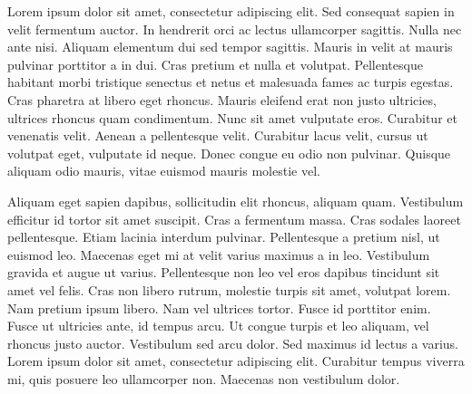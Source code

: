 \documentclass[./main.tex]{subfiles}
\begin{document}
\doublespacing %
\large

\newpage
\renewcommand{\headrulewidth}{0pt}
\thispagestyle{fancy}
\fancyhf{} %
\fancyfoot{} %
\fancyfoot[C]{\thepage}

\begin{center}
    \vspace{5mm}
\end{center}
\singlespacing
\normalsize

\par Lorem ipsum dolor sit amet, consectetur adipiscing elit. Sed consequat sapien in velit fermentum auctor. In hendrerit orci ac lectus ullamcorper sagittis. Nulla nec ante nisi. Aliquam elementum dui sed tempor sagittis. Mauris in velit at mauris pulvinar porttitor a in dui. Cras pretium et nulla et volutpat. Pellentesque habitant morbi tristique senectus et netus et malesuada fames ac turpis egestas. Cras pharetra at libero eget rhoncus. Mauris eleifend erat non justo ultricies, ultrices rhoncus quam condimentum. Nunc sit amet vulputate eros. Curabitur et venenatis velit. Aenean a pellentesque velit. Curabitur lacus velit, cursus ut volutpat eget, vulputate id neque. Donec congue eu odio non pulvinar. Quisque aliquam odio mauris, vitae euismod mauris molestie vel. 

\par Aliquam eget sapien dapibus, sollicitudin elit rhoncus, aliquam quam. Vestibulum efficitur id tortor sit amet suscipit. Cras a fermentum massa. Cras sodales laoreet pellentesque. Etiam lacinia interdum pulvinar. Pellentesque a pretium nisl, ut euismod leo. Maecenas eget mi at velit varius maximus a in leo. Vestibulum gravida et augue ut varius. Pellentesque non leo vel eros dapibus tincidunt sit amet vel felis. Cras non libero rutrum, molestie turpis sit amet, volutpat lorem. Nam pretium ipsum libero. Nam vel ultrices tortor. Fusce id porttitor enim. Fusce ut ultricies ante, id tempus arcu. Ut congue turpis et leo aliquam, vel rhoncus justo auctor. Vestibulum sed arcu dolor. Sed maximus id lectus a varius. Lorem ipsum dolor sit amet, consectetur adipiscing elit. Curabitur tempus viverra mi, quis posuere leo ullamcorper non. Maecenas non vestibulum dolor. 
\end{document}
